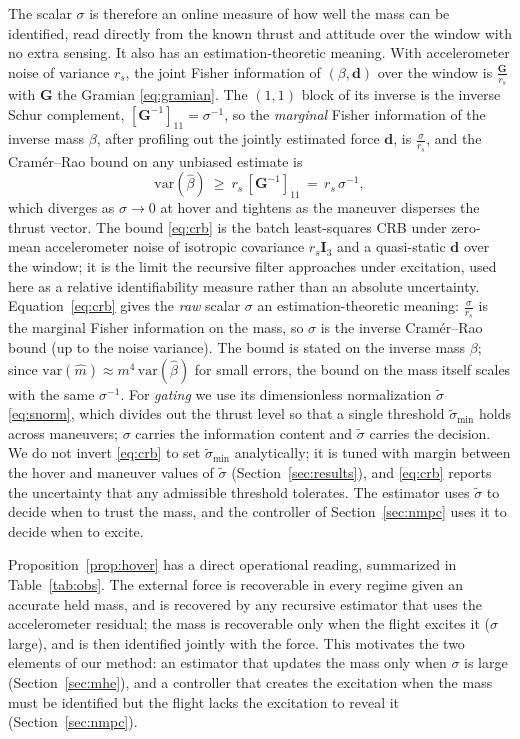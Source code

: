 \documentclass{ieeeaccess}
\newcommand{\vect}[1]{\bm{#1}}
\newcommand{\mat}[1]{\mathbf{#1}}
\begin{document}
The scalar $\sigma$ is therefore an online measure of how well the mass can be
identified, read directly from the known thrust and attitude over the window with
no extra sensing. It also has an estimation-theoretic meaning. With accelerometer
noise of variance $r_s$, the joint Fisher information of $(\beta,\vect{d})$ over
the window is $\tfrac{\mat{G}}{r_s}$ with $\mat{G}$ the Gramian \eqref{eq:gramian}. The
$(1,1)$ block of its inverse is the inverse Schur complement, $[\mat{G}^{-1}]_{11}=\sigma^{-1}$,
so the \emph{marginal} Fisher information of the inverse mass $\beta$, after
profiling out the jointly estimated force $\vect{d}$, is $\tfrac{\sigma}{r_s}$, and the
Cram\'er--Rao bound on any unbiased estimate is
\begin{equation}
\mathrm{var}(\hat\beta)\ \geq\ r_s\,[\mat{G}^{-1}]_{11}\,=\,r_s\,\sigma^{-1},
\label{eq:crb}
\end{equation}
which diverges as $\sigma\to0$ at hover and tightens as the maneuver disperses
the thrust vector. The bound \eqref{eq:crb} is the batch least-squares CRB under
zero-mean accelerometer noise of isotropic covariance $r_s\mat{I}_3$ and a
quasi-static $\vect{d}$ over the window; it is the limit the recursive filter
approaches under excitation, used here as a relative identifiability measure rather
than an absolute uncertainty. Equation~\eqref{eq:crb} gives the \emph{raw} scalar $\sigma$ an
estimation-theoretic meaning: $\tfrac{\sigma}{r_s}$ is the marginal Fisher information on the
mass, so $\sigma$ is the inverse Cram\'er--Rao bound (up to the noise variance).
The bound is stated on the inverse mass $\beta$; since
$\mathrm{var}(\hat m)\approx m^4\,\mathrm{var}(\hat\beta)$ for small errors, the
bound on the mass itself scales with the same $\sigma^{-1}$.
For \emph{gating} we use its dimensionless normalization $\tilde\sigma$
\eqref{eq:snorm}, which divides out the thrust level so that a single threshold
$\tilde\sigma_{\min}$ holds across maneuvers; $\sigma$ carries the information
content and $\tilde\sigma$ carries the decision. We do not invert \eqref{eq:crb} to
set $\tilde\sigma_{\min}$ analytically; it is tuned with margin between the hover and
maneuver values of $\tilde\sigma$ (Section~\ref{sec:results}), and \eqref{eq:crb}
reports the uncertainty that any admissible threshold tolerates. The estimator uses
$\tilde\sigma$ to decide when to trust the mass, and the controller of
Section~\ref{sec:nmpc} uses it to decide when to excite.

Proposition~\ref{prop:hover} has a direct operational reading, summarized in
Table~\ref{tab:obs}. The external force is recoverable in every regime given an
accurate held mass, and is
recovered by any recursive estimator that uses the accelerometer residual; the
mass is recoverable only when the
flight excites it ($\sigma$ large), and is then identified jointly with the
force. This motivates the two elements of our method: an estimator that updates
the mass only when $\sigma$ is large (Section~\ref{sec:mhe}), and a controller
that creates the excitation when the mass must be identified but the flight
lacks the excitation to reveal it (Section~\ref{sec:nmpc}).
\end{document}
